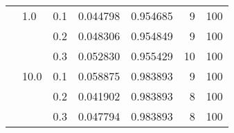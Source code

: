\begin{table}[H]
\begin{tabular}{lllrrrr}
       & 1.0  & 0.1 &  0.044798 &  0.954685 &       9 &   100 \\
       &      & 0.2 &  0.048306 &  0.954849 &       9 &   100 \\
       &      & 0.3 &  0.052830 &  0.955429 &      10 &   100 \\
       & 10.0 & 0.1 &  0.058875 &  0.983893 &       9 &   100 \\
       &      & 0.2 &  0.041902 &  0.983893 &       8 &   100 \\
       &      & 0.3 &  0.047794 &  0.983893 &       8 &   100 \\
\bottomrule
\end{tabular}
\end{table}
